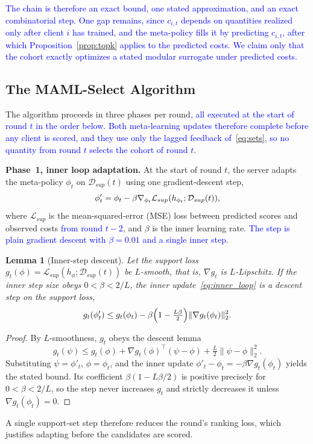 \documentclass[journal]{IEEEtran}
\newtheorem{Lemma}{Lemma}
\theoremstyle{remark}
\newcommand{\revision}[1]{#1}
\newcommand{\revtwo}[1]{\textcolor{blue}{#1}}
\begin{document}
\revtwo{The chain is therefore an exact bound, one stated approximation, and an exact combinatorial step. One gap remains, since $c_{i,t}$ depends on quantities realized only after client $i$ has trained, and the meta-policy fills it by predicting $c_{i,t}$, after which Proposition~\ref{prop:topk} applies to the predicted costs. We claim only that the cohort exactly optimizes a stated modular surrogate under predicted costs.}

\subsection{The MAML-Select Algorithm}\label{sec:method_selection}
The algorithm proceeds in three phases per round\revtwo{, all executed at the start of round $t$ in the order below. Both meta-learning updates therefore complete before any client is scored, and they use only the lagged feedback of~\eqref{eq:sets}, so no quantity from round $t$ selects the cohort of round $t$}.

\textbf{Phase~1, inner loop adaptation.}
At the start of round $t$, \revision{the server adapts the meta-policy $\phi_t$ on $\mathcal{D}_{sup}(t)$ using one gradient-descent step,}
\begin{equation}
	\color{black}
		\phi'_t = \phi_t - \beta \nabla_{\phi_t} \mathcal{L}_{sup}(h_{\phi_t};\mathcal{D}_{sup}(t)),
		\label{eq:inner_loop}
\end{equation}
where $\mathcal{L}_{sup}$ is the mean-squared-error (MSE) loss between predicted scores and observed costs \revtwo{from round $t-2$}, and $\beta$ is the inner learning rate\revtwo{. The step is plain gradient descent with $\beta=0.01$ and a single inner step}.

{\color{black}
\begin{Lemma}[Inner-step descent]\label{stmt:inner}
Let the support loss $g_t(\phi)=\mathcal{L}_{sup}(h_\phi;\mathcal{D}_{sup}(t))$ be $L$-smooth, that is, $\nabla g_t$ is $L$-Lipschitz. If the inner step size obeys $0<\beta<2/L$, the inner update~\eqref{eq:inner_loop} is a descent step on the support loss,
\[
g_t(\phi'_t)\le g_t(\phi_t)-\beta\Bigl(1-\tfrac{L\beta}{2}\Bigr)\lVert\nabla g_t(\phi_t)\rVert_2^2 .
\]
\end{Lemma}
\begin{proof}
By $L$-smoothness, $g_t$ obeys the descent lemma
\[
g_t(\psi)\le g_t(\phi)+\nabla g_t(\phi)^{\top}(\psi-\phi)+\tfrac{L}{2}\lVert\psi-\phi\rVert_2^2 .
\]
Substituting $\psi=\phi'_t$, $\phi=\phi_t$, and the inner update $\phi'_t-\phi_t=-\beta\nabla g_t(\phi_t)$ yields the stated bound. Its coefficient $\beta(1-L\beta/2)$ is positive precisely for $0<\beta<2/L$, so the step never increases $g_t$ and strictly decreases it unless $\nabla g_t(\phi_t)=0$.
\end{proof}
A single support-set step therefore reduces the round's ranking loss, which justifies adapting before the candidates are scored.
}
\end{document}
